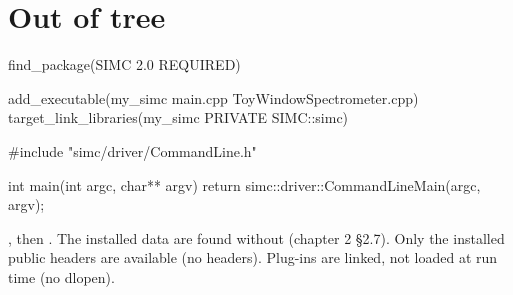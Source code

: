 \section{\texorpdfstring{Out of tree}{Out of tree}}\label{developer_manual-04u5fextending:46-out-of-tree}
\begin{simccode}[basicstyle=\ttfamily\footnotesize,style=simccmake]
find_package(SIMC 2.0 REQUIRED)

add_executable(my_simc main.cpp ToyWindowSpectrometer.cpp)
target_link_libraries(my_simc PRIVATE SIMC::simc)
\end{simccode}
\begin{simccode}[basicstyle=\ttfamily\footnotesize,style=simccpp]
#include "simc/driver/CommandLine.h"

int main(int argc, char** argv) { return simc::driver::CommandLineMain(argc, argv); }
\end{simccode}
, then . The installed data are found without  (chapter 2 §2.7). Only the installed public
headers are available (no  headers). Plug-ins are linked, not loaded at run time (no dlopen).

